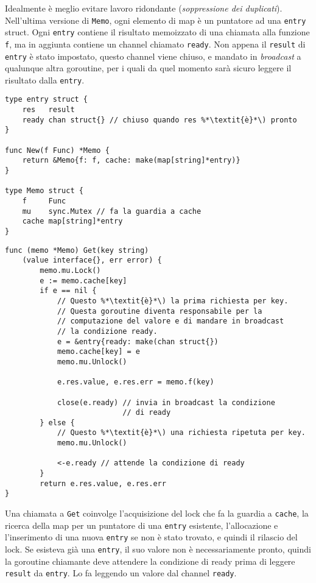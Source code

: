 Idealmente è meglio evitare lavoro ridondante (\textit{soppressione dei duplicati}).
Nell'ultima versione di \verb|Memo|, ogni elemento di map è un puntatore ad una \verb|entry| struct.
Ogni \verb|entry| contiene il risultato memoizzato di una chiamata alla funzione \verb|f|, ma in aggiunta contiene un channel chiamato \verb|ready|.
Non appena il \verb|result| di \verb|entry| è stato impostato, questo channel viene chiuso, e mandato in \textit{broadcast} a qualunque altra goroutine, per i quali da quel momento sarà sicuro leggere il risultato dalla \verb|entry|.
\begin{lstlisting}[frame=single, label={lst:lstlisting9-7.8}]
type entry struct {
    res   result
    ready chan struct{} // chiuso quando res %*\textit{è}*\) pronto
}

func New(f Func) *Memo {
    return &Memo{f: f, cache: make(map[string]*entry)}
}

type Memo struct {
    f     Func
    mu    sync.Mutex // fa la guardia a cache
    cache map[string]*entry
}
\end{lstlisting}
\begin{lstlisting}[frame=single, label={lst:lstlisting9-7.9}]
func (memo *Memo) Get(key string)
    (value interface{}, err error) {
        memo.mu.Lock()
        e := memo.cache[key]
        if e == nil {
            // Questo %*\textit{è}*\) la prima richiesta per key.
            // Questa goroutine diventa responsabile per la
            // computazione del valore e di mandare in broadcast
            // la condizione ready.
            e = &entry{ready: make(chan struct{})
            memo.cache[key] = e
            memo.mu.Unlock()

            e.res.value, e.res.err = memo.f(key)

            close(e.ready) // invia in broadcast la condizione
                           // di ready
        } else {
            // Questo %*\textit{è}*\) una richiesta ripetuta per key.
            memo.mu.Unlock()

            <-e.ready // attende la condizione di ready
        }
        return e.res.value, e.res.err
}
\end{lstlisting}
Una chiamata a \verb|Get| coinvolge l'acquisizione del lock che fa la guardia a \verb|cache|, la ricerca della map per un puntatore di una \verb|entry| esistente, l'allocazione e l'inserimento di una nuova \verb|entry| se non è stato trovato, e quindi il rilascio del lock.
Se esisteva già una \verb|entry|, il suo valore non è necessariamente pronto, quindi la goroutine chiamante deve attendere la condizione di ready prima di leggere \verb|result| da \verb|entry|.
Lo fa leggendo un valore dal channel \verb|ready|.

